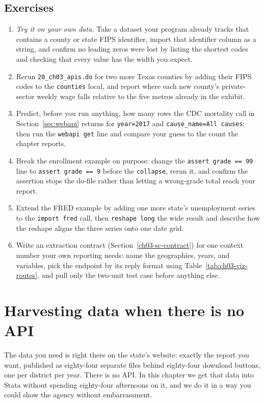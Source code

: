 \documentclass[
    a4paper,
    fontsize=10pt,
    twoside=true,
    numbers=noenddot,
]{kaobook}
\begin{document}
\section*{Exercises}
\begin{enumerate}
  \item \emph{Try it on your own data.} Take a dataset your program already tracks that contains a county or state FIPS identifier, import that identifier column as a string, and confirm no leading zeros were lost by listing the shortest codes and checking that every value has the width you expect.
  \item Rerun \texttt{20\_ch03\_apis.do} for two more Texas counties by adding their FIPS codes to the \texttt{counties} local, and report where each new county's private-sector weekly wage falls relative to the five metros already in the exhibit.
  \item Predict, before you run anything, how many rows the CDC mortality call in Section~\ref{sec:webapi} returns for \texttt{year=2017} and \texttt{cause\_name=All causes}; then run the \texttt{webapi get} line and compare your guess to the count the chapter reports.
  \item Break the enrollment example on purpose: change the \texttt{assert grade == 99} line to \texttt{assert grade == 9} before the \texttt{collapse}, rerun it, and confirm the assertion stops the do-file rather than letting a wrong-grade total reach your report.
  \item Extend the FRED example by adding one more state's unemployment series to the \texttt{import fred} call, then \texttt{reshape long} the wide result and describe how the reshape aligns the three series onto one date grid.
  \item Write an extraction contract (Section~\ref{ch03-sc-contract}) for one context number your own reporting needs: name the geographies, years, and variables, pick the endpoint by its reply format using Table~\ref{tab:ch03-viz-routes}, and pull only the two-unit test case before anything else.
\end{enumerate}

\chapter{Harvesting data when there is no API}\label{ch:noapi}

The data you need is right there on the state's website: exactly the report you want, published as eighty-four separate files behind eighty-four download buttons, one per district per year. There is no API. In this chapter we get that data into Stata without spending eighty-four afternoons on it, and we do it in a way you could show the agency without embarrassment.
\end{document}
